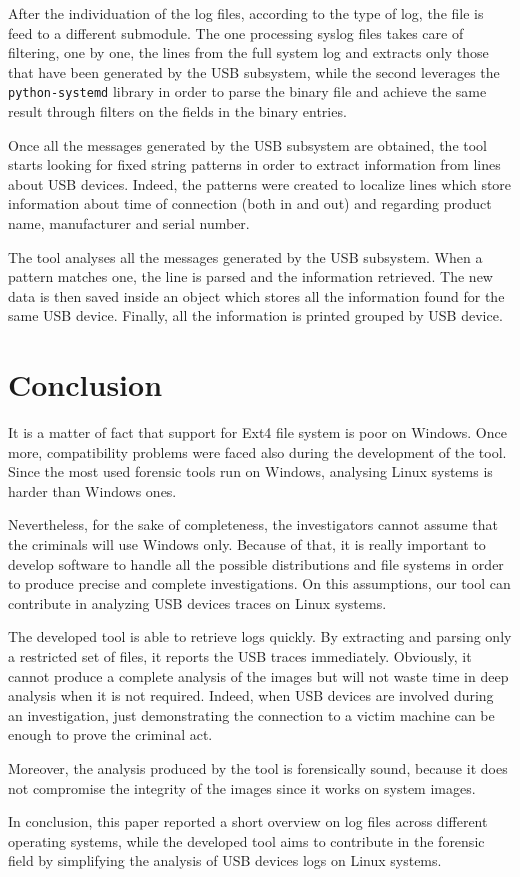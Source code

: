 \documentclass[a4paper]{article}
\begin{document}
After the individuation of the log files, according to the type of log, the
file is feed to a different submodule. The one processing syslog files takes
care of filtering, one by one, the lines from the full system log and extracts
only those that have been generated by the USB subsystem, while the second
leverages the \texttt{python-systemd} library in order to parse the binary file
and achieve the same result through filters on the fields in the binary
entries.

Once all the messages generated by the USB subsystem are obtained, the tool
starts looking for fixed string patterns in order to extract information from
lines about USB devices. Indeed, the patterns were created to localize lines
which store information about time of connection (both in and out) and
regarding product name, manufacturer and serial number.

The tool analyses all the messages generated by the USB subsystem. When a
pattern matches one, the line is parsed and the information retrieved. The new
data is then saved inside an object which stores all the information found for
the same USB device. Finally, all the information is printed grouped by USB
device.

\section{Conclusion}
\label{sec:concl}
It is a matter of fact that support for Ext4 file system is poor on Windows.
Once more, compatibility problems were faced also during the development of the
tool. Since the most used forensic tools run on Windows, analysing Linux
systems is harder than Windows ones.

Nevertheless, for the sake of completeness, the investigators cannot assume
that the criminals will use Windows only. Because of that, it is really
important to develop software to handle all the possible distributions and file
systems in order to produce precise and complete investigations. On this
assumptions, our tool can contribute in analyzing USB devices traces on Linux
systems.

The developed tool is able to retrieve logs quickly. By extracting and parsing
only a restricted set of files, it reports the USB traces immediately.
Obviously, it cannot produce a complete analysis of the images but will not
waste time in deep analysis when it is not required. Indeed, when USB devices
are involved during an investigation, just demonstrating the connection to a
victim machine can be enough to prove the criminal act.

Moreover, the analysis produced by the tool is forensically sound, because it
does not compromise the integrity of the images since it works on system
images.

In conclusion, this paper reported a short overview on log files across
different operating systems, while the developed tool aims to contribute in the
forensic field by simplifying the analysis of USB devices logs on Linux
systems.



\end{document}
